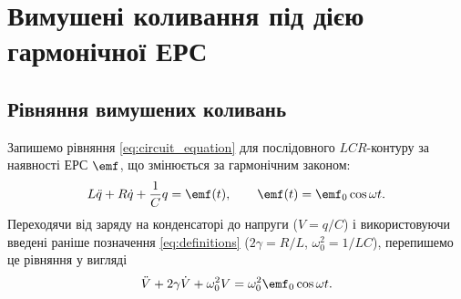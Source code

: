 \section{Вимушені коливання під дією гармонічної ЕРС}

\subsection*{Рівняння вимушених коливань}

Запишемо рівняння \eqref{eq:circuit_equation} для послідовного $LCR$-контуру за наявності ЕРС $\emf$,
що змінюється за гармонічним законом:
\begin{equation}\label{eq:forced_equation}
	L\ddot{q} + R\dot{q} + \frac{1}{C}q = \emf(t), \qquad
	\emf(t) = \emf_0 \cos\omega t.
\end{equation}
Переходячи від заряду на конденсаторі до напруги ($V = q/C$) і використовуючи введені раніше позначення \eqref{eq:definitions} ($2\gamma = R/L$, $\omega_0^2 = 1/LC$), перепишемо це рівняння у вигляді
\begin{equation}\label{eq:forced_equation_V}
	\ddot{V} + 2\gamma\dot{V} + \omega_0^2 V = \omega_0^2 \emf_0 \cos\omega t.
\end{equation}

